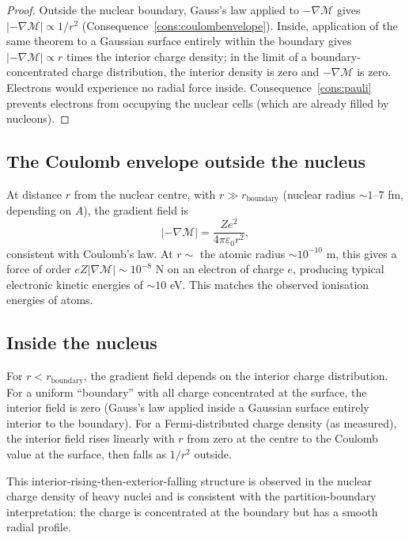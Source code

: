 \documentclass[11pt,twocolumn,a4paper]{article}
\theoremstyle{axiomstyle}
\theoremstyle{conseqstyle}
\theoremstyle{definition}
\theoremstyle{remark}
\newcommand{\Depth}{\mathcal{M}}
\begin{document}
\begin{proof}
Outside the nuclear boundary, Gauss's law applied to $-\nabla\Depth$ gives $|-\nabla\Depth|\propto 1/r^{2}$ (Consequence~\ref{cons:coulombenvelope}). Inside, application of the same theorem to a Gaussian surface entirely within the boundary gives $|-\nabla\Depth|\propto r$ times the interior charge density; in the limit of a boundary-concentrated charge distribution, the interior density is zero and $-\nabla\Depth$ is zero. Electrons would experience no radial force inside. Consequence~\ref{cons:pauli} prevents electrons from occupying the nuclear cells (which are already filled by nucleons).
\end{proof}

\subsection{The Coulomb envelope outside the nucleus}

At distance $r$ from the nuclear centre, with $r\gg r_{\text{boundary}}$ (nuclear radius $\sim 1$--$7$ fm, depending on $A$), the gradient field is
\begin{equation}
|-\nabla\Depth|=\frac{Ze^{2}}{4\pi\varepsilon_{0}r^{2}},
\end{equation}
consistent with Coulomb's law. At $r\sim$ the atomic radius $\sim 10^{-10}$ m, this gives a force of order $eZ|\nabla\Depth|\sim 10^{-8}$ N on an electron of charge $e$, producing typical electronic kinetic energies of $\sim 10$ eV. This matches the observed ionisation energies of atoms.

\subsection{Inside the nucleus}

For $r<r_{\text{boundary}}$, the gradient field depends on the interior charge distribution. For a uniform ``boundary'' with all charge concentrated at the surface, the interior field is zero (Gauss's law applied inside a Gaussian surface entirely interior to the boundary). For a Fermi-distributed charge density (as measured), the interior field rises linearly with $r$ from zero at the centre to the Coulomb value at the surface, then falls as $1/r^{2}$ outside.

This interior-rising-then-exterior-falling structure is observed in the nuclear charge density of heavy nuclei \citep{hofstadter1956} and is consistent with the partition-boundary interpretation: the charge is concentrated at the boundary but has a smooth radial profile.
\end{document}
